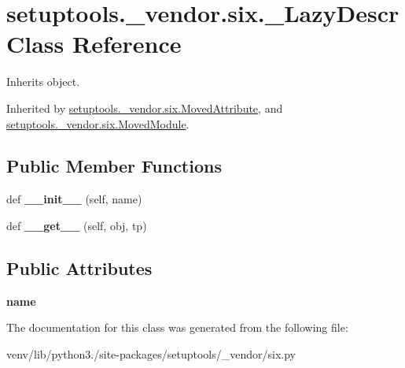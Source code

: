 \hypertarget{classsetuptools_1_1__vendor_1_1six_1_1___lazy_descr}{}\section{setuptools.\+\_\+vendor.\+six.\+\_\+\+Lazy\+Descr Class Reference}
\label{classsetuptools_1_1__vendor_1_1six_1_1___lazy_descr}


Inherits object.



Inherited by \hyperlink{classsetuptools_1_1__vendor_1_1six_1_1_moved_attribute}{setuptools.\+\_\+vendor.\+six.\+Moved\+Attribute}, and \hyperlink{classsetuptools_1_1__vendor_1_1six_1_1_moved_module}{setuptools.\+\_\+vendor.\+six.\+Moved\+Module}.

\subsection*{Public Member Functions}
\begin{DoxyCompactItemize}
\item 
\mbox{\label{classsetuptools_1_1__vendor_1_1six_1_1___lazy_descr_a25abea348edd3d9f5cd1cfceac96ae2e}} 
def {\bfseries \+\_\+\+\_\+init\+\_\+\+\_\+} (self, name)
\item 
\mbox{\label{classsetuptools_1_1__vendor_1_1six_1_1___lazy_descr_a9d8aa23304c7e21b6be9b6dd4798d451}} 
def {\bfseries \+\_\+\+\_\+get\+\_\+\+\_\+} (self, obj, tp)
\end{DoxyCompactItemize}
\subsection*{Public Attributes}
\begin{DoxyCompactItemize}
\item 
\mbox{\label{classsetuptools_1_1__vendor_1_1six_1_1___lazy_descr_a794eceffef1e53634ede32c52ccd637e}} 
{\bfseries name}
\end{DoxyCompactItemize}


The documentation for this class was generated from the following file\+:\begin{DoxyCompactItemize}
\item 
venv/lib/python3./site-\/packages/setuptools/\+\_\+vendor/six.\+py\end{DoxyCompactItemize}
